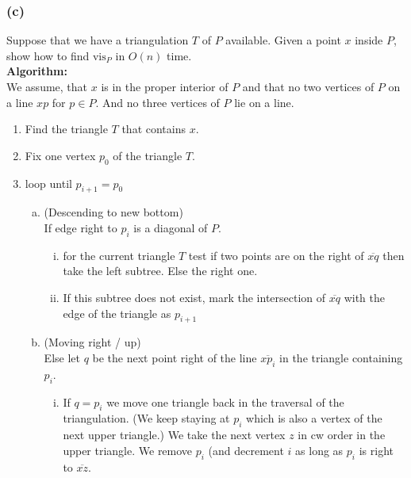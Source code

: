\documentclass[11pt,a4paper,ngerman]{article}
\begin{document}
\subsubsection*{(c)}
Suppose that we have a triangulation $T$ of $P$ available. Given a point $x$ inside $P$, show how to find $\text{vis}_P$ in $O(n)$ time.\\

\textbf{Algorithm:}\\

We assume, that $x$ is in the proper interior of $P$ and that no two vertices
of $P$ on a line $xp$ for $p \in P$. And no three vertices of $P$ lie on a line.

\begin{enumerate}[1.]
    \item Find the triangle $T$ that contains $x$.
    \item Fix one vertex $p_0$ of the triangle $T$.
    \item loop until $p_{i+1} = p_0$
        \begin{enumerate}[a.]
                \item (Descending to new bottom)\\
                    If edge right to $p_i$ is a diagonal of $P$.
                \begin{enumerate}[(i)]
                    \item for the current triangle $T$ test if
                        two points are on the right of $\overline{xq}$
                        then take the left subtree. Else the right one.
                    \item If this subtree does not exist, mark the intersection
                        of $\overline{xq}$ with the edge of the triangle as
                        $p_{i+1}$
                \end{enumerate}
                \item (Moving right / up)\\
                    Else let $q$ be the next point right of the line 
                    $\overline{xp_i}$ in the triangle containing $p_i$.
                    \begin{enumerate}[(i)]
                        \item If $q = p_i$ we move one triangle back in the
                            traversal of the triangulation. (We keep staying at
                            $p_i$ which is also a vertex of the next upper
                            triangle.)
                            We take the next vertex $z$ in cw order in
                            the upper triangle.
                            We remove $p_i$ (and decrement $i$ as long
                            as $p_i$ is right to $\overline{xz}$.\\
                            

\end{enumerate}
\end{enumerate}
\end{enumerate}
\end{document}
